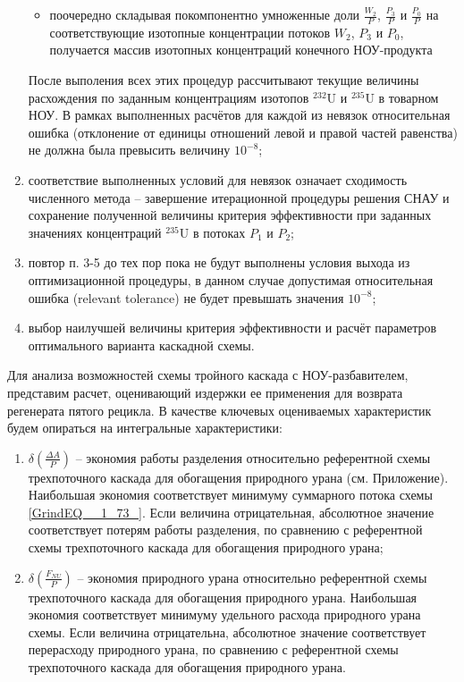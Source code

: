 \begin{enumerate}
\begin{itemize}
        \item поочередно складывая покомпонентно умноженные доли $\frac{W_{2}}{P}$, $\frac{P_{3}}{P}$ и $\frac{P_{0}}{P}$ на соответствующие изотопные концентрации потоков $W_2$, $P_3$ и $P_0$, получается массив изотопных концентраций конечного НОУ-продукта
        \end{itemize}
    После выполения всех этих процедур рассчитывают текущие величины расхождения по заданным концентрациям изотопов $^{232}$U и $^{235}$U в товарном НОУ. В рамках выполненных расчётов для каждой из невязок относительная ошибка (отклонение от единицы отношений левой и правой частей равенства) не должна была превысить величину $10^{-8}$;
    \item соответствие выполненных условий для невязок означает сходимость численного метода -- завершение итерационной процедуры решения СНАУ и сохранение полученной величины критерия эффективности при заданных значениях концентраций $^{235}$U в потоках $P_1$ и $P_2$;
    \item повтор п. 3-5 до тех пор пока не будут выполнены условия выхода из оптимизационной процедуры, в данном случае допустимая относительная ошибка (relevant tolerance) не будет превышать значения $10^{-8}$;
    \item выбор наилучшей величины критерия эффективности и расчёт параметров оптимального варианта каскадной схемы.
\end{enumerate}




Для анализа возможностей схемы тройного каскада с НОУ-разбавителем, представим расчет, оценивающий издержки ее применения для возврата регенерата пятого рецикла. 
В качестве ключевых оцениваемых характеристик будем опираться на интегральные характеристики:
\begin{enumerate}
    \item $\delta(\frac{\Delta A}{P})$ -- экономия работы разделения относительно референтной схемы трехпоточного каскада для обогащения природного урана (см. Приложение). Наибольшая экономия соответствует минимуму суммарного потока схемы \ref{GrindEQ__1_73_}. Если величина отрицательная, абсолютное значение соответствует потерям работы разделения, по сравнению с референтной схемы трехпоточного каскада для обогащения природного урана;
    \item $\delta(\frac{F_{NU}}{P})$ -- экономия природного урана относительно референтной схемы трехпоточного каскада для обогащения природного урана.  Наибольшая экономия соответствует минимуму удельного расхода природного урана схемы. Если величина отрицательна, абсолютное значение соответствует перерасходу природного урана, по сравнению с референтной схемы трехпоточного каскада для обогащения природного урана.
\end{enumerate}

